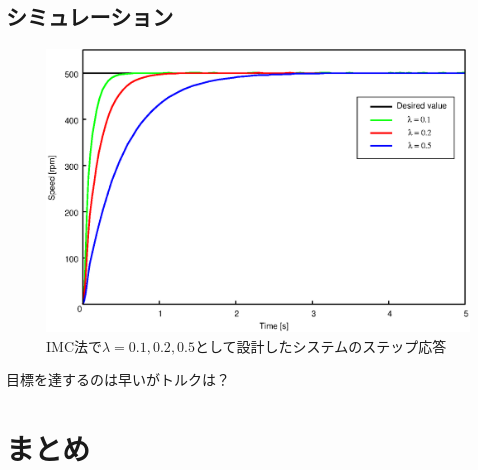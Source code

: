 \documentclass[a4paper,12pt]{jarticle}
\begin{document}
\subsection{シミュレーション}
%
\begin{figure}[tbp]
 \begin{center}
  \includegraphics[width = 150mm]{fig/IMC_result.eps}
 \end{center}
 \caption{IMC法で$\lambda=0.1,0.2,0.5$として設計したシステムのステップ応答}
 \label{fig:IMC_result}
\end{figure}
%

目標を達するのは早いがトルクは？
\section{まとめ}
\end{document}
